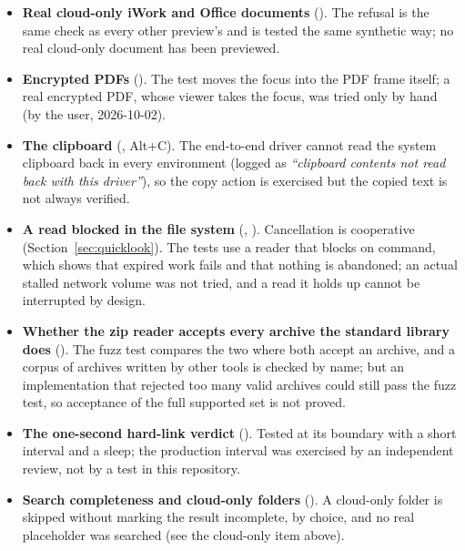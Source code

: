 \begin{itemize}
        () falls back to dispatching the underlying drag events directly
        (logged by the suite as \emph{``safari did not complete a native drop \ldots;
        falling back to synthetic drag events''}); this has not been confirmed with an
        actual pointer drag in Safari.
  \item \textbf{Real cloud-only iWork and Office documents} ().  The
        refusal is the same check as every other preview's and is tested the same
        synthetic way; no real cloud-only document has been previewed.
  \item \textbf{Encrypted PDFs} ().  The test moves the focus into the PDF
        frame itself; a real encrypted PDF, whose viewer takes the focus, was tried only
        by hand (by the user, 2026-10-02).
  \item \textbf{The clipboard} (, Alt+C).  The end-to-end driver
        cannot read the system clipboard back in every environment (logged as
        \emph{``clipboard contents not read back with this driver''}), so the copy
        action is exercised but the copied text is not always verified.
  \item \textbf{A read blocked in the file system} (, ).
        Cancellation is cooperative (Section~\ref{sec:quicklook}).  The tests use a
        reader that blocks on command, which shows that expired work fails and that
        nothing is abandoned; an actual stalled network volume was not tried, and a read
        it holds up cannot be interrupted by design.
  \item \textbf{Whether the zip reader accepts every archive the standard library does}
        ().  The fuzz test compares the two where both accept an archive, and
        a corpus of archives written by other tools is checked by name; but an
        implementation that rejected too many valid archives could still pass the fuzz
        test, so acceptance of the full supported set is not proved.
  \item \textbf{The one-second hard-link verdict} ().  Tested at its boundary
        with a short interval and a sleep; the production interval was exercised by an
        independent review, not by a test in this repository.
  \item \textbf{Search completeness and cloud-only folders} ().  A cloud-only
        folder is skipped without marking the result incomplete, by choice, and no real
        placeholder was searched (see the cloud-only item above).

\end{itemize}
